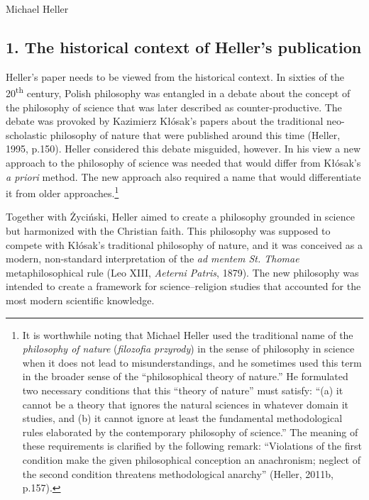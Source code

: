 \begin{artengenv}{Michael Heller}
\subsection{1. The historical context of Heller’s publication}
Heller’s paper needs to be viewed from the historical context. In sixties of the 20\textsuperscript{th} century, Polish
philosophy was entangled in a debate about the concept of the philosophy of science that was later described as
counter-productive. The debate was provoked by Kazimierz Kłósak’s papers about the traditional neo-scholastic
philosophy of nature that were published around this time (Heller, 1995, p.150). Heller considered this debate
misguided, however. In his view a new approach to the philosophy of science was needed that would differ from Kłósak’s
\textit{a priori} method. The new approach also required a name that would differentiate it from older
approaches.\footnote{It is worthwhile noting that Michael Heller used the traditional name of the \textit{philosophy of
nature }(\textit{filozofia przyrody}) in the sense of philosophy in science when it does not lead to misunderstandings,
and he sometimes used this term in the broader sense of the “philosophical theory of nature.” He formulated two
necessary conditions that this “theory of nature” must satisfy: “(a) it cannot be a theory that ignores the natural
sciences in whatever domain it studies, and (b) it cannot ignore at least the fundamental methodological rules
elaborated by the contemporary philosophy of science.” The meaning of these requirements is clarified by the following
remark: “Violations of the first condition make the given philosophical conception an anachronism; neglect of the
second condition threatens methodological anarchy” (Heller, 2011b, p.157).}

Together with Życiński, Heller aimed to create a philosophy grounded in science but harmonized with the Christian faith.
This philosophy was supposed to compete with Kłósak’s traditional philosophy of nature, and it was conceived as a
modern, non-standard interpretation of the \textit{ad mentem St. Thomae }metaphilosophical rule (Leo XIII,
\textit{Aeterni Patris}, 1879). The new philosophy was intended to create a framework for science–religion studies that
accounted for the most modern scientific knowledge. 


\end{artengenv}
